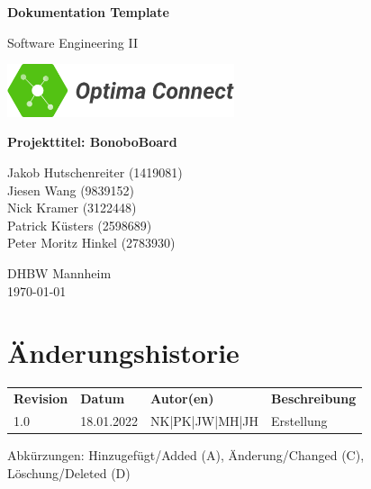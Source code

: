 \documentclass[a4paper,11pt]{scrartcl}
\begin{document}
\renewcommand*{\arraystretch}{1.2}
\begin{titlepage}
    \begin{center}
        \vspace*{1cm}\Huge
        \textbf{Dokumentation Template}\par                
        \vspace{0.5cm}\LARGE        
        Software Engineering II\par           
        \vspace{2cm}
        \includegraphics[width=0.5\textwidth]{OptimaLogo_long}\par   
        \vspace{1cm}
        \textbf{Projekttitel: BonoboBoard}\par        
        \vfill\Large   
        Jakob Hutschenreiter (1419081)\\Jiesen Wang (9839152)\\Nick Kramer (3122448)\\Patrick Küsters (2598689)\\Peter Moritz Hinkel (2783930)\par
        \vspace{2cm}
        DHBW Mannheim\\
        \today     
    \end{center}
\end{titlepage}

\section*{Änderungshistorie}
\begin{table}[h]
	\begin{tabular}{@{} p{20mm} p{25mm} p{35mm} p{75mm}}
		\textbf{Revision} & \textbf{Datum} & \textbf{Autor(en)} & \textbf{Beschreibung}\\
		1.0 & 18.01.2022 & NK|PK|JW|MH|JH & Erstellung\\
	\end{tabular}
\end{table}
\noindent
Abkürzungen: Hinzugefügt/Added (A), Änderung/Changed (C), Löschung/Deleted (D)
\vspace{2cm}
\tableofcontents
\newpage
{}
\end{document}

